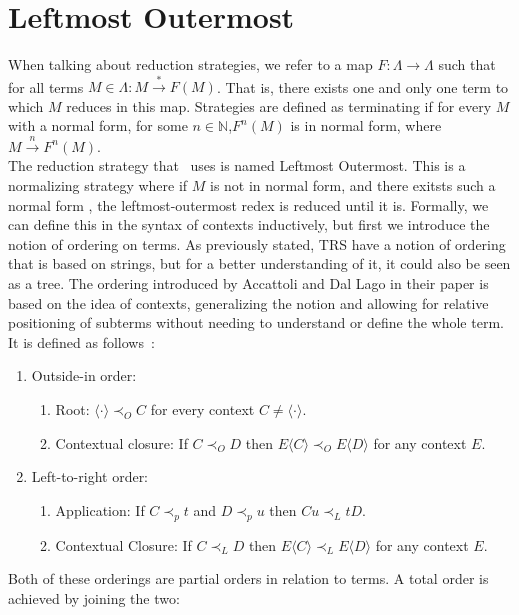\documentclass[11pt]{article}
\begin{document}
\section{Leftmost Outermost}
When talking about reduction strategies, we refer to a map $F : \Lambda \rightarrow \Lambda$ such that for all terms $M \in \Lambda : M \xrightarrow{*} F(M)$. That is, there exists one and only one term to which $M$ reduces in this map. Strategies are defined as terminating if for every $M$ with a normal form, for some $n \in \mathbb{N}$,$ F^{n} (M)$ is in normal form, where $M \xrightarrow{n} F^n(M)$. \\
The reduction strategy that~\cite{beta-invariance} uses is named Leftmost Outermost. This is a normalizing strategy where if $M$ is not in normal form, and there exitsts such a normal form , the leftmost-outermost redex is reduced until it is. Formally, we can define this in the syntax of contexts inductively, but first we introduce the notion of ordering on terms. As previously stated, TRS have a notion of ordering that is based on strings, but for a better understanding of it, it could also be seen as a tree. The ordering introduced by Accattoli and Dal Lago in their paper is based on the idea of contexts, generalizing the notion and allowing for relative positioning of subterms without needing to understand or define the whole term. It is defined as follows~\cite{beta-invariance}:
\begin{enumerate}
  \item Outside-in order:
        \begin{enumerate}
          \item Root: $\langle \cdot \rangle \prec_{O} C$ for every context $C \neq \langle \cdot \rangle$.
          \item Contextual closure: If $C \prec_{O} D$ then $E\langle C \rangle \prec_{O} E\langle D \rangle $ for any context $E$.
        \end{enumerate}
  \item Left-to-right order:
        \begin{enumerate}
          \item Application: If $C \prec_{p} t$ and $D \prec_{p} u$ then $Cu \prec_{L} tD$.
          \item Contextual Closure: If $C \prec_{L} D$ then  $E\langle C \rangle \prec_{L} E\langle D\rangle$ for any context $E$.
        \end{enumerate}
\end{enumerate}
Both of these orderings are partial orders in relation to terms. A total order is achieved by joining the two:
\end{document}
